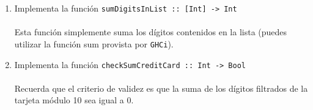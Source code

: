 \begin{exercise}
\begin{enumerate}
           \item  Implementa la función \texttt{sumDigitsInList :: [Int] ->\ Int} \\\\
                  Esta función simplemente suma los dígitos contenidos en la lista (puedes utilizar la función sum provista por \texttt{GHCi}).\\
           \item  Implementa la función \texttt{checkSumCreditCard :: Int ->\ Bool}\\\\
                  Recuerda que el criterio de validez es que la suma de los dígitos filtrados de la tarjeta módulo 10 sea igual a 0.
                    
        \end{enumerate}    
    \end{exercise}

